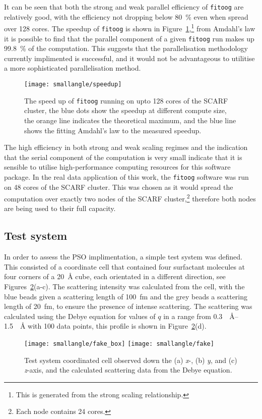 It can be seen that both the strong and weak parallel efficiency of \texttt{fitoog} are relatively good, with the efficiency not dropping below \SI{80}{\percent} even when spread over 128 cores.
The speedup of \texttt{fitoog} is shown in Figure~\ref{fig:speedup},\footnote{This is generated from the strong scaling relationship.} from Amdahl's law\autocite{amdahl_validity_1967} it is possible to find that the parallel component of a given \texttt{fitoog} run makes up \SI{99.8}{\percent} of the computation.
This suggests that the parallelisation methodology currently implimented is successful, and it would not be advantageous to utilitise a more sophisticated parallelisation method.
%
\begin{figure}
    \centering
    \texttt{[image: smallangle/speedup]}
    \caption{The speed up of \texttt{fitoog} running on upto 128 cores of the SCARF cluster, the blue dots show the speedup at different compute size, the orange line indicates the theoretical maximum, and the blue line shows the fitting Amdahl's law to the measured speedup.}
    \label{fig:speedup}
\end{figure}
%

The high efficiency in both strong and weak scaling regimes and the indication that the serial component of the computation is very small indicate that it is sensible to utilise high-performance computing resources for this software package.
In the real data application of this work, the \texttt{fitoog} software was run on 48 cores of the SCARF cluster.
This was chosen as it would spread the computation over exactly two nodes of the SCARF cluster,\footnote{Each node contains 24 cores.} therefore both nodes are being used to their full capacity.

\subsection{Test system}
In order to assess the PSO implimentation, a simple test system was defined.
This consisted of a coordinate cell that contained four surfactant molecules at four corners of a \SI{20}{\angstrom} cube, each orientated in a different direction, see Figures~\ref{fig:test}(a-c).
The scattering intensity was calculated from the cell, with the blue beads given a scattering length of \SI{100}{\femto\meter} and the grey beads a scattering length of \SI{20}{\femto\meter}, to ensure the presence of intense scattering.
The scattering was calculated using the Debye equation\autocite{debye_zerstreuung_1915} for values of $q$ in a range from \SIrange{0.3}{1.5}{\per\angstrom} with 100 data points, this profile is shown in Figure~\ref{fig:test}(d).
%
\begin{figure}
    \centering
    \texttt{[image: smallangle/fake\_box]}
    \texttt{[image: smallangle/fake]}
    \caption{Test system coordinated cell observed down the (a) \emph{x}-, (b) \emph{y}, and (c) \emph{z}-axis, and the calculated scattering data from the Debye equation.}
    \label{fig:test}
\end{figure}
%

